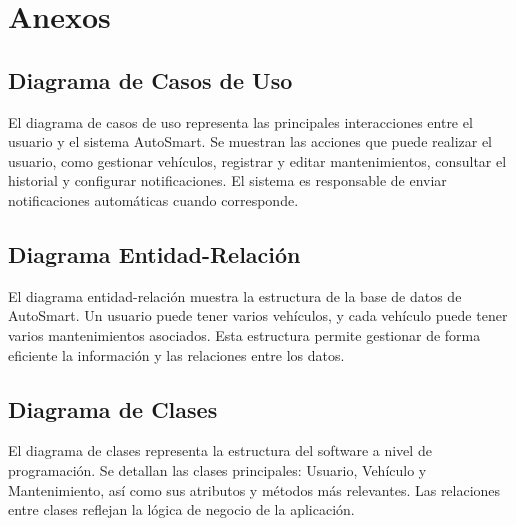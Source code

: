 \chapter{Anexos}

\section{Diagrama de Casos de Uso}
El diagrama de casos de uso representa las principales interacciones entre el usuario y el sistema AutoSmart. Se muestran las acciones que puede realizar el usuario, como gestionar vehículos, registrar y editar mantenimientos, consultar el historial y configurar notificaciones. El sistema es responsable de enviar notificaciones automáticas cuando corresponde.


\section{Diagrama Entidad-Relación}
El diagrama entidad-relación muestra la estructura de la base de datos de AutoSmart. Un usuario puede tener varios vehículos, y cada vehículo puede tener varios mantenimientos asociados. Esta estructura permite gestionar de forma eficiente la información y las relaciones entre los datos.


\section{Diagrama de Clases}
El diagrama de clases representa la estructura del software a nivel de programación. Se detallan las clases principales: Usuario, Vehículo y Mantenimiento, así como sus atributos y métodos más relevantes. Las relaciones entre clases reflejan la lógica de negocio de la aplicación.


